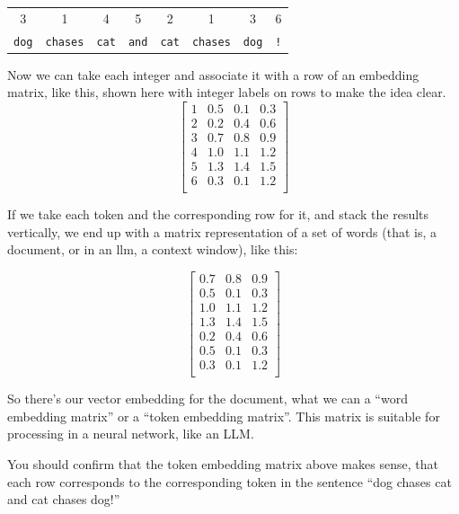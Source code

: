 \begin{center}
\begin{tabular}{c@{}c@{}c@{}c@{}c@{}c@{}c@{}c}
   3 & 1 & 4 & 5 & 2 & 1 & 3 & \hspace{0.5cm}6 \\
   \texttt{dog} & \texttt{\quad chases} & \texttt{\quad cat} & \texttt{\quad and} & \texttt{\quad cat} & \texttt{\quad chases} & \texttt{\quad dog} & \texttt{\quad !} \\
\end{tabular}
\end{center}

Now we can take each integer and associate it with a row of an embedding matrix, like this, shown here with integer labels on rows to make the idea clear.
\[
\left[\begin{array}{c|ccc}
    1 & 0.5 & 0.1 & 0.3 \\
    2 & 0.2 & 0.4 & 0.6 \\
    3 & 0.7 & 0.8 & 0.9 \\
    4 & 1.0 & 1.1 & 1.2 \\
    5 & 1.3 & 1.4 & 1.5 \\
    6 & 0.3 & 0.1 & 1.2 \\
\end{array}\right]
\]

If we take each token and the corresponding row for it, and stack the results vertically, we end up with a matrix representation of a set of words (that is, a document, or in an llm, a context window), like this: 

\[
\begin{bmatrix}
    0.7 & 0.8 & 0.9 \\
    0.5 & 0.1 & 0.3 \\
    1.0 & 1.1 & 1.2 \\
    1.3 & 1.4 & 1.5 \\
    0.2 & 0.4 & 0.6 \\
    0.5 & 0.1 & 0.3 \\
    0.3 & 0.1 & 1.2 \\
\end{bmatrix}
\]

So there's our vector embedding for the document,  what we can a ``word embedding matrix'' or a ``token embedding matrix''. This matrix is suitable for processing in a neural network, like an LLM. 

You should confirm that the token embedding matrix above makes sense, that each row corresponds to the corresponding token in the sentence ``dog chases cat and cat chases dog!''